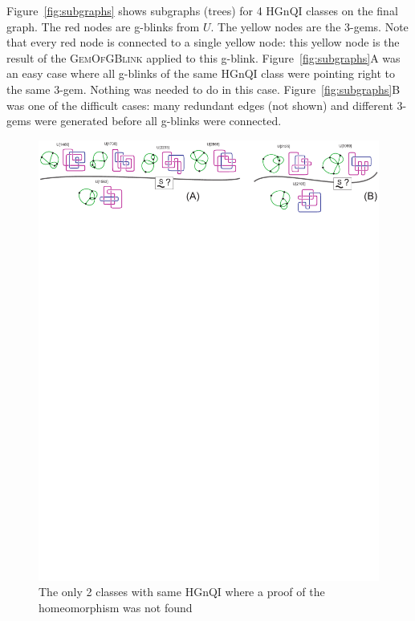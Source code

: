 Figure~\ref{fig:subgraphs} shows subgraphs (trees) for 4 HGnQI
classes on the final graph. The red nodes are g-blinks from $U$. The
yellow nodes are the 3-gems. Note that every red node is connected
to a single yellow node: this yellow node is the result of the
\textsc{GemOfGBlink} applied to this g-blink.
Figure~\ref{fig:subgraphs}A was an easy case where all g-blinks
of the same HGnQI class were pointing right to the same 3-gem.
Nothing was needed to do in this case. Figure~\ref{fig:subgraphs}B
was one of the difficult cases: many redundant edges (not shown) and
different 3-gems were generated before all g-blinks were connected.
\begin{figure}[htp]
   \begin{center}
      \leavevmode
      \includegraphics[width=16cm]{fig/doubts.pdf}
   \end{center}
   \vspace{-0.7cm}
   \caption{ The only 2 classes with same HGnQI where a proof of the homeomorphism was not found}
   \label{fig:doubts}
\end{figure}

